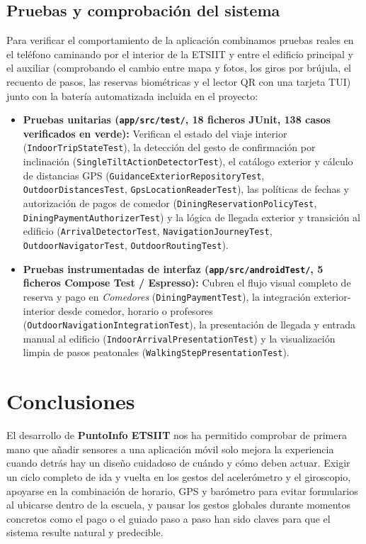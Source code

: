 \documentclass[11pt,a4paper]{article}
\begin{document}
\clearpage
\subsection{Pruebas y comprobación del sistema}
Para verificar el comportamiento de la aplicación combinamos pruebas reales en el teléfono caminando por el interior de la ETSIIT y entre el edificio principal y el auxiliar (comprobando el cambio entre mapa y fotos, los giros por brújula, el recuento de pasos, las reservas biométricas y el lector QR con una tarjeta TUI) junto con la batería automatizada incluida en el proyecto:
\begin{itemize}[leftmargin=1.8em]
    \item \textbf{Pruebas unitarias (\texttt{app/src/test/}, 18 ficheros JUnit, 138 casos verificados en verde):} Verifican el estado del viaje interior (\texttt{IndoorTripStateTest}), la detección del gesto de confirmación por inclinación (\texttt{SingleTiltActionDetectorTest}), el catálogo exterior y cálculo de distancias GPS (\texttt{GuidanceExteriorRepositoryTest}, \texttt{OutdoorDistancesTest}, \texttt{GpsLocationReaderTest}), las políticas de fechas y autorización de pagos de comedor (\texttt{DiningReservationPolicyTest}, \texttt{DiningPaymentAuthorizerTest}) y la lógica de llegada exterior y transición al edificio (\texttt{ArrivalDetectorTest}, \texttt{NavigationJourneyTest}, \texttt{OutdoorNavigatorTest}, \texttt{OutdoorRoutingTest}).
    \item \textbf{Pruebas instrumentadas de interfaz (\texttt{app/src/androidTest/}, 5 ficheros Compose Test / Espresso):} Cubren el flujo visual completo de reserva y pago en \textit{Comedores} (\texttt{DiningPaymentTest}), la integración exterior-interior desde comedor, horario o profesores (\texttt{OutdoorNavigationIntegrationTest}), la presentación de llegada y entrada manual al edificio (\texttt{IndoorArrivalPresentationTest}) y la visualización limpia de pasos peatonales (\texttt{WalkingStepPresentationTest}).
\end{itemize}

\section{Conclusiones}

El desarrollo de \textbf{PuntoInfo ETSIIT} nos ha permitido comprobar de primera mano que añadir sensores a una aplicación móvil solo mejora la experiencia cuando detrás hay un diseño cuidadoso de cuándo y cómo deben actuar. Exigir un ciclo completo de ida y vuelta en los gestos del acelerómetro y el giroscopio, apoyarse en la combinación de horario, GPS y barómetro para evitar formularios al ubicarse dentro de la escuela, y pausar los gestos globales durante momentos concretos como el pago o el guiado paso a paso han sido claves para que el sistema resulte natural y predecible.
\end{document}
